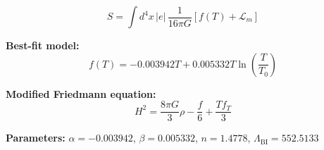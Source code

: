 
\begin{equation}
  S = \int d^4x \, |e| \, \frac{1}{16\pi G} \left[ f(T) + \mathcal{L}_m \right]
\end{equation}

\textbf{Best-fit model:}
\begin{equation}
  f(T) = -0.003942 T + 0.005332 T \ln\!\left(\frac{T}{T_0}\right)
\end{equation}

\textbf{Modified Friedmann equation:}
\begin{equation}
  H^2 = \frac{8\pi G}{3} \rho - \frac{f}{6} + \frac{T f_T}{3}
\end{equation}

\textbf{Parameters:}
$\alpha = -0.003942$, \quad
$\beta = 0.005332$, \quad
$n = 1.4778$, \quad
$\Lambda_{\text{BI}} = 552.5133$